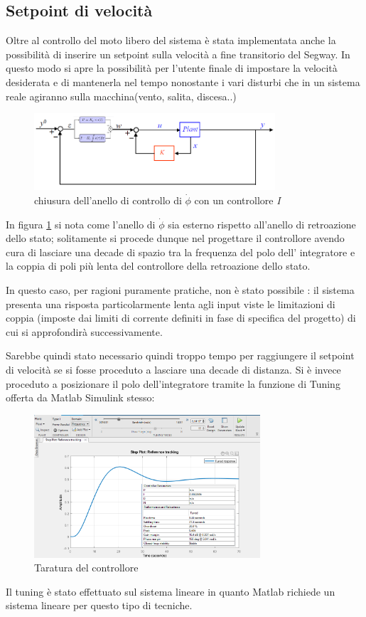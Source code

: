 \subsection{Setpoint di velocità}
Oltre al controllo del moto libero del sistema è stata implementata anche la possibilità di inserire un setpoint sulla velocità a fine transitorio del Segway. In questo modo si apre la possibilità per l'utente finale di impostare la velocità desiderata e di mantenerla nel tempo nonostante i vari disturbi che in un sistema reale agiranno sulla macchina(vento, salita, discesa..) 
\begin{figure}[H]
	\centering   	
	\includegraphics[width=0.8\textwidth]{Immagini/y_setpoint.png}
	\caption{chiusura dell'anello di controllo di $\dot{\phi}$ con un controllore \textit{I} 
	\cite{feedback_state}}
	\label{fig:y_setpoint}
\end{figure}
In figura \ref{fig:y_setpoint} si nota come l'anello di $\dot{\phi}$ sia esterno rispetto all'anello di retroazione dello stato; solitamente si procede dunque nel progettare il controllore avendo cura di lasciare una decade di spazio tra la frequenza del polo dell' integratore e la coppia di poli più lenta del controllore della retroazione dello stato.

In questo caso, per ragioni puramente pratiche, non è stato possibile : il sistema presenta una risposta particolarmente lenta agli input viste le limitazioni di coppia (imposte dai limiti di corrente definiti in fase di specifica del progetto) di cui si approfondirà successivamente.

Sarebbe quindi stato necessario quindi troppo tempo per raggiungere il setpoint di velocità se si fosse proceduto a lasciare una decade di distanza. Si è invece proceduto a posizionare il polo dell'integratore tramite la funzione di Tuning offerta da Matlab Simulink stesso:
\begin{figure}[H]
	\centering   	
	\includegraphics[width=0.75\textwidth]{Immagini/pid_tuning.png}
	\caption{Taratura del controllore}
	\label{fig:pid_tuning}
\end{figure}
Il tuning è stato effettuato sul sistema lineare in quanto Matlab richiede un sistema lineare per questo tipo di tecniche.

